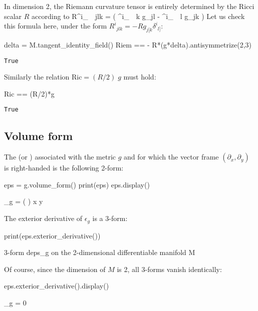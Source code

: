 In dimension 2, the Riemann curvature tensor is entirely determined by the Ricci scalar $R$ according to
\be
 R^i_{\ \, jlk} =  \left( \delta^i_{\ \, k} g_{jl} - \delta^i_{\ \, l} g_{jk} \right)
\ee
Let us check this formula here, under the form
$R^i_{\ \, jlk} = -R g_{j[k} \delta^i_{\ \, l]}$:
\begin{NBin}
delta = M.tangent_identity_field()
Riem == - R*(g*delta).antisymmetrize(2,3)
\end{NBin}
\begin{NBout}
\texttt{True}
\end{NBout}
Similarly the relation $\mathrm{Ric} = (R/2)\; g$ must hold:
\begin{NBin}
Ric == (R/2)*g
\end{NBin}
\begin{NBout}
\texttt{True}
\end{NBout}

\subsection{Volume form}

The  (or ) associated with the
metric $g$ and for which the vector frame $(\partial_x,\partial_y)$ is
right-handed is the following 2-form:
\begin{NBin}
eps = g.volume_form()
print(eps)
eps.display()
\end{NBin}
\begin{NBoutM}
\epsilon_{g} = \left(  \right)  x\wedge {} y
\end{NBoutM}
The exterior derivative of $\epsilon_g$ is a 3-form:
\begin{NBin}
print(eps.exterior_derivative())
\end{NBin}
\begin{NBprint}
3-form deps_g on the 2-dimensional differentiable manifold M
\end{NBprint}
Of course, since the dimension of $M$ is 2, all 3-forms vanish identically:
\begin{NBin}
eps.exterior_derivative().display()
\end{NBin}
\begin{NBoutM}
\epsilon_{g} = 0
\end{NBoutM}
